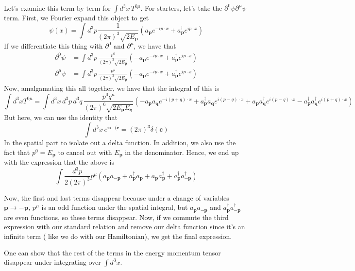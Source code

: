 Let's examine this term by term for $ \int d^3 x \, T^{ 0 \mu }$. For starters, let's take the $\partial^0 \psi \partial^\mu \psi $ term. First, we Fourier expand this object to get 
\[  
\psi( x) = \int d^3 p \frac{1}{(2 \pi )^3 \sqrt{ 2 E_\mathbf{p}} } \left( a_\mathbf{p} e^{ - i p \cdot x }  + a^\dagger_\mathbf{p} e^{ i p \cdot x } \right) \] 
If we differentiate this thing with $\partial^0$ and $\partial^\mu$, we have that 
\begin{align*} 
\partial^0 \psi & = \int d^3 p \,  \frac{p^0}{ (2 \pi )^3 \sqrt{ 2 E_\mathbf{p}} } \left(  - a_\mathbf{p} e^{ - i p \cdot x } + a_\mathbf{p}^\dagger e^{ i p \cdot x} \right) \\ 
\partial^\mu \psi & = \int d^3 p \, \frac{p^\mu}{ (2 \pi )^3 \sqrt{2 E_\mathbf{p}}} \left( - a_\mathbf{p} e^{ - i p \cdot x}  + a_\mathbf{p}^\dagger e^{ i p \cdot x } \right)  
\end{align*}    
Now, amalgamating this all together, we have that the integral of this is \[ \int d^3 x T^{ 0 \mu }  = \int d^3 x \, d^3 p \, d^3 q \, \frac{ p^0 q^\mu}{ ( 2 \pi )^6 \sqrt{ 2 E_\mathbf{p} E_\mathbf{q} }} \left( - a_\mathbf{p} a_\mathbf{q} e^{ - i ( p + q ) \cdot x } + a_\mathbf{p}^\dagger a_\mathbf{q} e^{ i ( p - q) \cdot x } + a_\mathbf{p} a_\mathbf{q}^\dagger e^{ i ( p -q ) \cdot x }  - a_\mathbf{p}^\dagger a_\mathbf{q}^\dagger e^{ i ( p + q ) \cdot x } \right) \] 
But here, we can use the identity that 
\[ 
\int d^3 x \, e^{i \mathbf{x} \cdot (\mathbf{c } }  = (2 \pi )^3 \delta ( \mathbf{ c} ) \] 
In the spatial part to isolate out a delta function. In addition, we also use the fact that $p^0 = E_\mathbf{p} $ to cancel out with $E_\mathbf{p}$ in the denominator. Hence, we end up with the expression that the above is 
\[ 
\int \frac{ d^3 p }{2 ( 2 \pi )^3 } p^\mu (a_\mathbf{p} a_\mathbf{ -p } + a_\mathbf{p}^\dagger a_\mathbf{p} + a_\mathbf{p} a_\mathbf{p}^\dagger + a_\mathbf{p}^\dagger a_{ \mathbf{ - p } }^\dagger ) \]  

Now, the first and last terms disappear because under a change of variables $\mathbf{p} \rightarrow \mathbf{ - p} $, $p^\mu$ is an odd function under the spatial integral, but $a_\mathbf{p} a_\mathbf{ -p} $ and $a_\mathbf{p}^\dagger a_\mathbf{-p}^\dagger$ are even functions, so these terms disappear. Now, if we commute the third expression with our standard relation and remove our delta function since it's an infinite term ( like we do with our Hamiltonian), we get the final expression. 

One can show that the rest of the terms in the energy momentum tensor disappear under integrating over $\int d^3 x $. 

